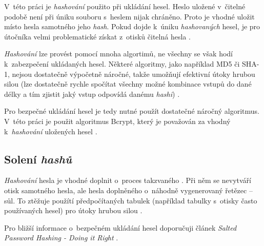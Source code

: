 V~této práci je \textit{hashování} použito při ukládání hesel. Heslo uložené v~čitelné podobě není při úniku souboru s~heslem nijak chráněno. Proto je vhodné uložit místo hesla samotného jeho \textit{hash}. Pokud dojde k~úniku \textit{hashovaných} hesel, je pro útočníka velmi problematické  získat z~otisků čitelná hesla \cite{hash_crackstation}.

\textit{Hashování} lze provést pomocí mnoha algortimů, ne všechny se však hodí k~zabezpečení ukládaných hesel. Některé algoritmy, jako například MD5 či SHA-1, nejsou dostatečně výpočetně náročné, takže umožňují efektivní útoky hrubou silou (lze dostatečně rychle spočítat všechny možné kombinace vstupů do dané délky a tím zjistit jaký vstup odpovídá danému \textit{hashi}) \cite{hash_crackstation}. 

Pro bezpečné ukládání hesel je tedy nutné použít dostatečné náročný algoritmus. V~této práci je použit algoritmus Bcrypt, který je považován za vhodný k~\textit{hashování} uložených hesel \cite{hash_crackstation}.

\subsection{Solení \textit{hashů}}

\textit{Hashování} hesla je vhodné doplnit o~proces takzvaného . Při něm se nevytváří otisk samotného hesla, ale hesla doplněného o~náhodně vygenerovaný řetězec -- sůl. To ztěžuje použítí předpočítaných tabulek (například tabulky s~otisky často používaných hesel) pro útoky hrubou silou \cite{hash_crackstation}.

Pro bližší informace o~bezpečném ukládání hesel doporučuji článek \textit{Salted Password Hashing - Doing it Right} \cite{hash_crackstation}.

